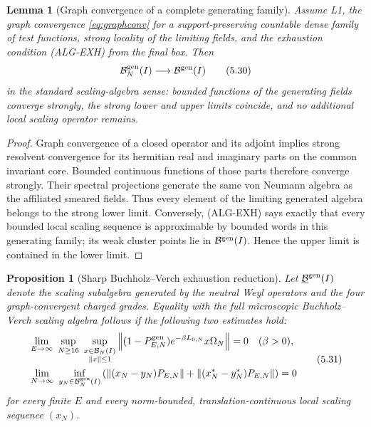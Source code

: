 \documentclass[11pt]{article}
\newtheorem{proposition}[theorem]{Proposition}
\newtheorem{lemma}[theorem]{Lemma}
\theoremstyle{remark}
\newcommand{\B}{\mathcal B}
\newcommand{\norm}[1]{\left\lVert#1\right\rVert}
\begin{document}
\begin{lemma}[Graph convergence of a complete generating family]
\label{lem:algconv}
Assume L1, the graph convergence \eqref{eq:graphconv} for a
support-preserving countable dense family of test functions, strong
locality of the limiting fields, and the exhaustion condition
\textup{(ALG-EXH)} from the final box.  Then
\[
 \B_N^{\rm gen}(I)\longrightarrow\B^{\rm gen}(I)
\tag{5.30}\label{eq:algconv}
\]
in the standard scaling-algebra sense: bounded functions of the
generating fields converge strongly, the strong lower and upper limits
coincide, and no additional local scaling operator remains.
\end{lemma}

\begin{proof}
Graph convergence of a closed operator and its adjoint implies strong
resolvent convergence for its hermitian real and imaginary parts on the
common invariant core.  Bounded continuous functions of those parts
therefore converge strongly.  Their spectral projections generate the
same von Neumann algebra as the affiliated smeared fields.  Thus every
element of the limiting generated algebra belongs to the strong lower
limit.  Conversely, \textup{(ALG-EXH)} says exactly that every bounded local
scaling sequence is approximable by bounded words in this generating
family; its weak cluster points lie in $\B^{\rm gen}(I)$.  Hence the
upper limit is contained in the lower limit.
\end{proof}

\begin{proposition}[Sharp Buchholz--Verch exhaustion reduction]
\label{prop:BVexhaustion}
Let $\underline{\B}^{\rm gen}(I)$ denote the scaling subalgebra generated
by the neutral Weyl operators and the four graph-convergent charged
grades.  Equality with the full microscopic Buchholz--Verch scaling
algebra follows if the following two estimates hold:
\[
\begin{split}
 &\lim_{E\to\infty}\ \sup_{N\ge16}\
 \sup_{\substack{x\in\B_N(I)\\\norm{x}\le1}}
 \norm{(1-P^{\rm gen}_{E,N})e^{-\beta L_{0,N}}x\Omega_N}=0
 \quad(\beta>0),\\
 &\lim_{N\to\infty}\ 
 \inf_{y_N\in\B_N^{\rm gen}(I)}
 \left(
 \norm{(x_N-y_N)P_{E,N}}
 +\norm{(x_N^*-y_N^*)P_{E,N}}
 \right)=0
\end{split}
\tag{5.31}\label{eq:EXHsharp}
\]
for every finite $E$ and every norm-bounded, translation-continuous
local scaling sequence $(x_N)$.
\end{proposition}
\end{document}
